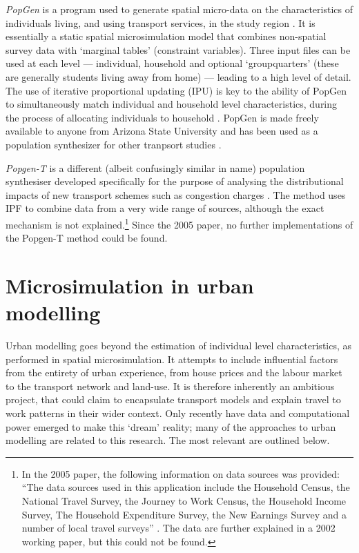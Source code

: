 \emph{PopGen} is a program used
to generate spatial micro-data on the characteristics of individuals
living, and using transport services, in the study region
\citep{Ravulaparthy2011}. It 
is essentially a static spatial microsimulation model that combines non-spatial
survey data with `marginal tables'
(constraint variables). Three input files can be used at each level ---
individual, household and optional `groupquarters'
(these are generally students living away from home) --- leading to a high level of
detail. The use of iterative proportional updating (IPU) is key to the
ability of PopGen to simultaneously match individual and household level
characteristics, during the process of allocating individuals to household
\citep{ye2009methodology}. PopGen is made freely available to
anyone from Arizona State University and has been used as a population
synthesizer for other tranpsort studies \citep{pendyala2012application}.

\emph{Popgen-T} is a different (albeit confusingly similar in name) population
synthesiser developed specifically for the purpose of analysing the
distributional impacts of new transport schemes such as congestion charges
\citep{Bonsall2005}. The method uses IPF to combine data from a very wide range
of sources, although the exact mechanism is not
explained.\footnote{In the 2005 paper, the following information on
data sources was provided: ``The data sources used in this application include the
Household Census, the National Travel Survey, the Journey to Work Census,
the Household Income Survey, The Household Expenditure Survey,
the New Earnings Survey and a number of local travel surveys'' \citep[p.~410]{Bonsall2005}.
The data are further explained in a 2002 working paper, but this could not
be found.} Since the 2005 paper, no further implementations of the Popgen-T method
could be found.




\section{Microsimulation in urban modelling}
\label{s:urbanmodel}
Urban modelling goes beyond the estimation of individual level
characteristics, as performed in spatial microsimulation.
It attempts to include influential factors from the entirety of
urban experience, from house prices and the labour market to
the transport network and land-use. It is therefore inherently
an ambitious project, that could claim to encapsulate transport models
and explain travel to work patterns in their wider context.
Only recently have data and computational power emerged to
make this `dream' reality; many of the approaches to urban
modelling are related to this research. The most relevant are outlined below.


